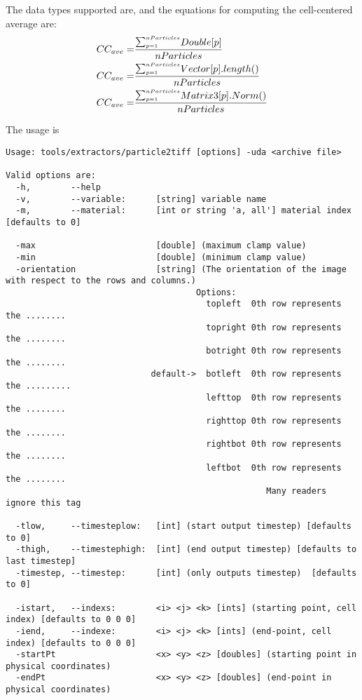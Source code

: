 The data types supported are, and the equations for computing the cell-centered average are:
\begin{eqnarray}
  CC_{ave} =& {\raise1.5pt\hbox{$\scriptstyle\sum_{p=1}^{nParticles}$}} Double[p]          \over {nParticles} \nonumber \\
  CC_{ave} =& {\raise1.5pt\hbox{$\scriptstyle\sum_{p=1}^{nParticles}$}} Vector[p].length() \over {nParticles} \nonumber \\
  CC_{ave} =& {\raise1.5pt\hbox{$\scriptstyle\sum_{p=1}^{nParticles}$}} Matrix3[p].Norm()  \over {nParticles}\nonumber
\end{eqnarray}

\noindent The usage is
\begin{Verbatim}[fontsize=\footnotesize]
Usage: tools/extractors/particle2tiff [options] -uda <archive file>

Valid options are:
  -h,        --help
  -v,        --variable:      [string] variable name
  -m,        --material:      [int or string 'a, all'] material index [defaults to 0]

  -max                        [double] (maximum clamp value)
  -min                        [double] (minimum clamp value)
  -orientation                [string] (The orientation of the image with respect to the rows and columns.)
                                      Options:
                                        topleft  0th row represents the ........
                                        topright 0th row represents the ........
                                        botright 0th row represents the ........
                             default->  botleft  0th row represents the .........
                                        lefttop  0th row represents the ........
                                        righttop 0th row represents the ........
                                        rightbot 0th row represents the ........
                                        leftbot  0th row represents the ........
                                                    Many readers ignore this tag

  -tlow,     --timesteplow:   [int] (start output timestep) [defaults to 0]
  -thigh,    --timestephigh:  [int] (end output timestep) [defaults to last timestep]
  -timestep, --timestep:      [int] (only outputs timestep)  [defaults to 0]

  -istart,   --indexs:        <i> <j> <k> [ints] (starting point, cell index) [defaults to 0 0 0]
  -iend,     --indexe:        <i> <j> <k> [ints] (end-point, cell index) [defaults to 0 0 0]
  -startPt                    <x> <y> <z> [doubles] (starting point in physical coordinates)
  -endPt                      <x> <y> <z> [doubles] (end-point in physical coordinates)


\end{Verbatim}
